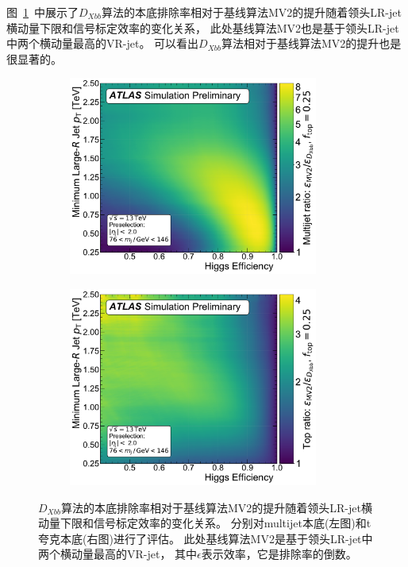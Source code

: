 图~\ref{fig:PTMV2}~中展示了$D_{Xbb}$算法的本底排除率相对于基线算法MV2的提升随着领头LR-jet横动量下限和信号标定效率的变化关系，
此处基线算法MV2也是基于领头LR-jet中两个横动量最高的VR-jet。
可以看出$D_{Xbb}$算法相对于基线算法MV2的提升也是很显著的。

\begin{figure}[!thbp]
  \begin{subfigure}{.5\textwidth}
  \centering
  \includegraphics[width=0.9\textwidth]{figuresXbb/pulled/roc2d/ratio/mv2/dijet.pdf}
  \caption{}
  \end{subfigure}
  \begin{subfigure}{.5\textwidth}
  \centering
  \includegraphics[width=0.9\textwidth]{figuresXbb/pulled/roc2d/ratio/mv2/top.pdf}
  \caption{}
  \end{subfigure}
  \caption{
  $D_{Xbb}$算法的本底排除率相对于基线算法MV2的提升随着领头LR-jet横动量下限和信号标定效率的变化关系。
  分别对multijet本底(左图)和t夸克本底(右图)进行了评估。
  此处基线算法MV2是基于领头LR-jet中两个横动量最高的VR-jet，
  其中$\epsilon$表示效率，它是排除率的倒数。
  }
\label{fig:PTMV2}
\end{figure}

